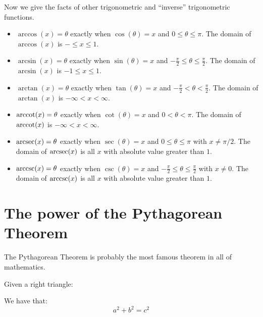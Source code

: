 \documentclass{ximera}
\begin{document}
Now we give the facts of other trigonometric and ``inverse''
trigonometric functions.

\begin{definition}
  \begin{itemize}\hfil
    \item $\arccos(x) = \theta$ exactly when $\cos(\theta) = x$ and
      $0\le \theta\le \pi$. The domain of $\arccos(x)$ is $-\le x\le
      1$.
    \item $\arcsin(x) = \theta$ exactly when $\sin(\theta) = x$ and $-\frac{\pi}{2}\le \theta\le \frac{\pi}{2}$. The domain of $\arcsin(x)$ is $-1\le x\le 1$.
    \item $\arctan(x) = \theta$ exactly when $\tan(\theta) = x$ and
      $-\frac{\pi}{2}< \theta< \frac{\pi}{2}$. The domain of
      $\arctan(x)$ is $-\infty<x<\infty$.
    \item $\operatorname{arccot}(x) = \theta$ exactly when $\cot(\theta) = x$ and $0< \theta< \pi$. The domain of $\operatorname{arccot}(x)$ is $-\infty<x<\infty$.
    \item $\operatorname{arcsec}(x) = \theta$ exactly when $\sec(\theta) = x$ and $0\le \theta\le \pi$ with $x\ne \pi/2$. The domain of $\operatorname{arcsec}(x)$ is all $x$ with absolute value greater than $1$.
      \item $\operatorname{arccsc}(x) = \theta$ exactly when $\csc(\theta) = x$ and $-\frac{\pi}{2}\le \theta\le \frac{\pi}{2}$ with $x\ne 0$. The domain of $\operatorname{arccsc}(x)$ is all $x$ with absolute value greater than $1$.
  \end{itemize}
\end{definition}


\section{The power of the Pythagorean Theorem}

The Pythagorean Theorem is probably the most famous theorem in all of
mathematics.


\begin{theorem}
Given a right triangle:
\begin{image}
\end{image}
We have that:
\[
a^2 + b^2 = c^2
\]
\end{theorem}
\end{document}

